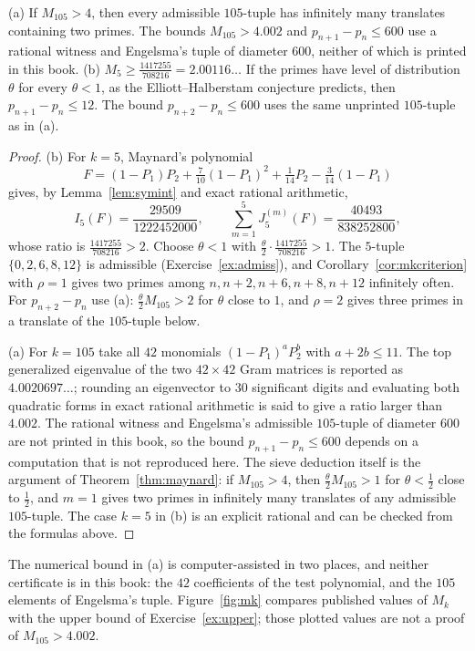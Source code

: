 \begin{theorem}[Maynard, 2013]\label{thm:six}
(a) If $M_{105}>4$, then every admissible $105$-tuple has infinitely many translates containing two primes. The bounds $M_{105}>4.002$ and $p_{n+1}-p_n\le600$ use a rational witness and Engelsma's tuple of diameter $600$, neither of which is printed in this book.
(b) $M_5\ge\frac{1417255}{708216}=2.00116\ldots$ If the primes have level of distribution $\theta$ for every $\theta<1$, as the Elliott--Halberstam conjecture predicts, then $p_{n+1}-p_n\le12$. The bound $p_{n+2}-p_n\le600$ uses the same unprinted $105$-tuple as in (a).
\end{theorem}
\begin{proof}
(b) For $k=5$, Maynard's polynomial
\[
F=(1-P_1)P_2+\tfrac7{10}(1-P_1)^2+\tfrac1{14}P_2-\tfrac3{14}(1-P_1)
\]
gives, by Lemma~\ref{lem:symint} and exact rational arithmetic,
\[
I_5(F)=\frac{29509}{1222452000},\qquad\sum_{m=1}^5J_5^{(m)}(F)=\frac{40493}{838252800},
\]
whose ratio is $\frac{1417255}{708216}>2$. Choose $\theta<1$ with $\frac\theta2\cdot\frac{1417255}{708216}>1$. The $5$-tuple $\{0,2,6,8,12\}$ is admissible (Exercise~\ref{ex:admiss}), and Corollary~\ref{cor:mkcriterion} with $\rho=1$ gives two primes among $n,n+2,n+6,n+8,n+12$ infinitely often. For $p_{n+2}-p_n$ use (a): $\frac\theta2M_{105}>2$ for $\theta$ close to $1$, and $\rho=2$ gives three primes in a translate of the $105$-tuple below.

(a) For $k=105$ take all $42$ monomials $(1-P_1)^aP_2^b$ with $a+2b\le11$. The top generalized eigenvalue of the two $42\times42$ Gram matrices is reported as $4.0020697\ldots$; rounding an eigenvector to $30$ significant digits and evaluating both quadratic forms in exact rational arithmetic is said to give a ratio larger than $4.002$. The rational witness and Engelsma's admissible $105$-tuple of diameter $600$ are not printed in this book, so the bound $p_{n+1}-p_n\le600$ depends on a computation that is not reproduced here. The sieve deduction itself is the argument of Theorem~\ref{thm:maynard}: if $M_{105}>4$, then $\frac\theta2M_{105}>1$ for $\theta<\frac12$ close to $\frac12$, and $m=1$ gives two primes in infinitely many translates of any admissible $105$-tuple. The case $k=5$ in (b) is an explicit rational and can be checked from the formulas above.
\end{proof}

The numerical bound in (a) is computer-assisted in two places, and neither certificate is in this book: the $42$ coefficients of the test polynomial, and the $105$ elements of Engelsma's tuple. Figure~\ref{fig:mk} compares published values of $M_k$ with the upper bound of Exercise~\ref{ex:upper}; those plotted values are not a proof of $M_{105}>4.002$.

